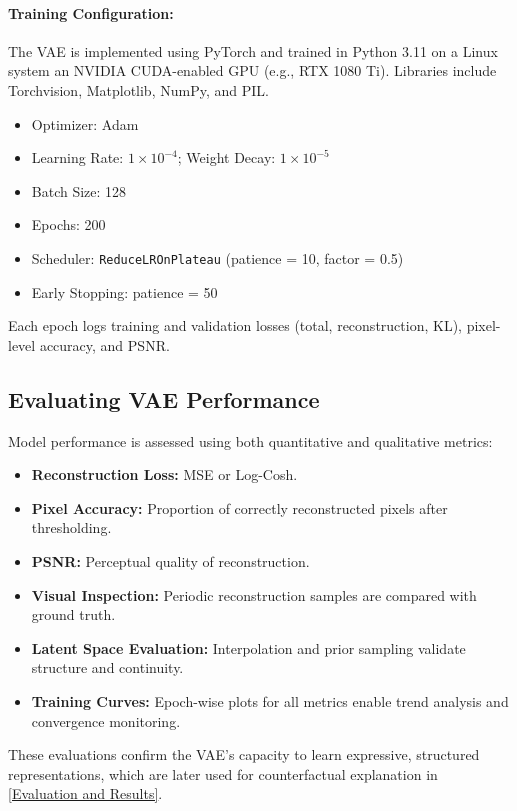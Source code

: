 \paragraph{Training Configuration:}
The VAE is implemented using PyTorch and trained in Python 3.11 on a Linux system an NVIDIA CUDA-enabled GPU (e.g., RTX 1080 Ti). Libraries include Torchvision, Matplotlib, NumPy, and PIL.

\begin{itemize}
    \item Optimizer: Adam
    \item Learning Rate: $1 \times 10^{-4}$; Weight Decay: $1 \times 10^{-5}$
    \item Batch Size: 128
    \item Epochs: 200
    \item Scheduler: \texttt{ReduceLROnPlateau} (patience = 10, factor = 0.5)
    \item Early Stopping: patience = 50
\end{itemize}

Each epoch logs training and validation losses (total, reconstruction, KL), pixel-level accuracy, and PSNR.

\subsection{Evaluating VAE Performance} \label{subsec:vae_evaluation}

Model performance is assessed using both quantitative and qualitative metrics:
\begin{itemize}
\item \textbf{Reconstruction Loss:} MSE or Log-Cosh.
\item \textbf{Pixel Accuracy:} Proportion of correctly reconstructed pixels after thresholding.
\item \textbf{PSNR:} Perceptual quality of reconstruction.
\item \textbf{Visual Inspection:} Periodic reconstruction samples are compared with ground truth.
\item \textbf{Latent Space Evaluation:} Interpolation and prior sampling validate structure and continuity.
\item \textbf{Training Curves:} Epoch-wise plots for all metrics enable trend analysis and convergence monitoring.
\end{itemize}

These evaluations confirm the VAE's capacity to learn expressive, structured representations, which are later used for counterfactual explanation in \autoref{Evaluation and Results}.



